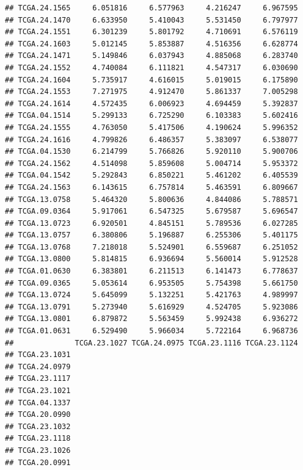 \documentclass[UTF8]{beamer}\usepackage[]{graphicx}\usepackage[]{color}
\makeatletter
\newenvironment{kframe}{%
 \def\at@end@of@kframe{}%
 \ifinner\ifhmode%
  \def\at@end@of@kframe{\end{minipage}}%
  \begin{minipage}{\columnwidth}%
 \fi\fi%
 \def\FrameCommand##1{\hskip\@totalleftmargin \hskip-\fboxsep
 \colorbox{shadecolor}{##1}\hskip-\fboxsep
     \hskip-\linewidth \hskip-\@totalleftmargin \hskip\columnwidth}%
 \MakeFramed {\advance\hsize-\width
   \@totalleftmargin\z@ \linewidth\hsize
   \@setminipage}}%
 {\par\unskip\endMakeFramed%
 \at@end@of@kframe}
\newenvironment{knitrout}{}{} %
\makeatother
\begin{document}
\begin{frame}[fragile]
\begin{knitrout}
\begin{kframe}
\begin{verbatim}
## TCGA.24.1565     6.051816     6.577963     4.216247     6.967595
## TCGA.24.1470     6.633950     5.410043     5.531450     6.797977
## TCGA.24.1551     6.301239     5.801792     4.710691     6.576119
## TCGA.24.1603     5.012145     5.853887     4.516356     6.628774
## TCGA.24.1471     5.149846     6.037943     4.885068     6.283740
## TCGA.24.1552     4.740084     6.111821     4.547317     6.030690
## TCGA.24.1604     5.735917     4.616015     5.019015     6.175890
## TCGA.24.1553     7.271975     4.912470     5.861337     7.005298
## TCGA.24.1614     4.572435     6.006923     4.694459     5.392837
## TCGA.04.1514     5.299133     6.725290     6.103383     5.602416
## TCGA.24.1555     4.763050     5.417506     4.190624     5.996352
## TCGA.24.1616     4.799826     6.486357     5.383097     6.538077
## TCGA.04.1530     6.214799     5.766826     5.920110     5.900706
## TCGA.24.1562     4.514098     5.859608     5.004714     5.953372
## TCGA.04.1542     5.292843     6.850221     5.461202     6.405539
## TCGA.24.1563     6.143615     6.757814     5.463591     6.809667
## TCGA.13.0758     5.464320     5.800636     4.844086     5.788571
## TCGA.09.0364     5.917061     6.547325     5.679587     5.696547
## TCGA.13.0723     6.920501     4.845151     5.789536     6.027285
## TCGA.13.0757     6.380806     5.196887     6.255306     5.401175
## TCGA.13.0768     7.218018     5.524901     6.559687     6.251052
## TCGA.13.0800     5.814815     6.936694     5.560014     5.912528
## TCGA.01.0630     6.383801     6.211513     6.141473     6.778637
## TCGA.09.0365     5.053614     6.953505     5.754398     5.661750
## TCGA.13.0724     5.645099     5.132251     5.421763     4.989997
## TCGA.13.0791     5.273940     5.616929     4.524705     5.923086
## TCGA.13.0801     6.879872     5.563459     5.992438     6.936272
## TCGA.01.0631     6.529490     5.966034     5.722164     6.968736
##              TCGA.23.1027 TCGA.24.0975 TCGA.23.1116 TCGA.23.1124
## TCGA.23.1031                                                    
## TCGA.24.0979                                                    
## TCGA.23.1117                                                    
## TCGA.23.1021                                                    
## TCGA.04.1337                                                    
## TCGA.20.0990                                                    
## TCGA.23.1032                                                    
## TCGA.23.1118                                                    
## TCGA.23.1026                                                    
## TCGA.20.0991                                                    

\end{verbatim}
\end{kframe}
\end{knitrout}
\end{frame}
\end{document}
